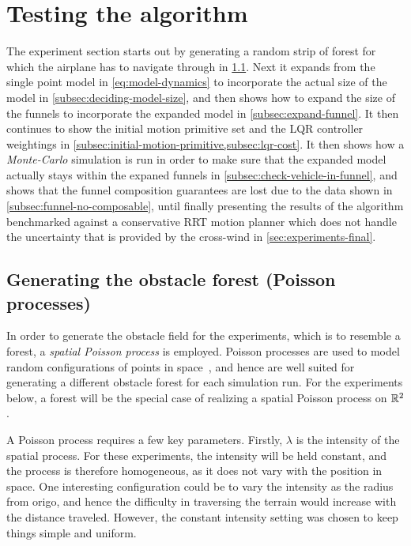 \section{Testing the \rrtfunnel{} algorithm}

The experiment section starts out by generating a random strip of forest for
which the airplane has to navigate through in \cref{sec:Poisson-Process}. Next
it expands from the single point model in \cref{eq:model-dynamics} to
incorporate the actual size of the model in \cref{subsec:deciding-model-size},
and then shows how to expand the size of the funnels to incorporate the expanded
model in \cref{subsec:expand-funnel}. It then continues to show the initial
motion primitive set and the \ac{LQR} controller weightings in
\cref{subsec:initial-motion-primitive,subsec:lqr-cost}. It then shows how a
\textit{Monte-Carlo} simulation is run in order to make sure that the expanded
model actually stays within the expaned funnels in
\cref{subsec:check-vehicle-in-funnel}, and shows that the funnel composition
guarantees are lost due to the data shown in \cref{subsec:funnel-no-composable},
until finally presenting the results of the \rrtfunnel{} algorithm benchmarked
against a conservative \ac{RRT} motion planner which does not handle the
uncertainty that is provided by the cross-wind in \cref{sec:experiments-final}.

\subsection{Generating the obstacle forest (Poisson processes)}
\label{sec:Poisson-Process}

In order to generate the obstacle field for the experiments, which is to
resemble a forest, a \textit{spatial Poisson process} is employed. Poisson
processes are used to model random configurations of points in
space~\cite{Kroese_2014}, and hence are well suited for generating a different
obstacle forest for each simulation run. For the experiments below, a forest
will be the special case of realizing a spatial Poisson process on \(\mathbb{R}^2\).

A Poisson process requires a few key parameters. Firstly, \(\lambda\) is the
intensity of the spatial process. For these experiments, the intensity will be
held constant, and the process is therefore homogeneous, as it does not vary
with the position in space. One interesting configuration could be to vary the
intensity as the radius from origo, and hence the difficulty in traversing the
terrain would increase with the distance traveled. However, the constant
intensity setting was chosen to keep things simple and uniform.

